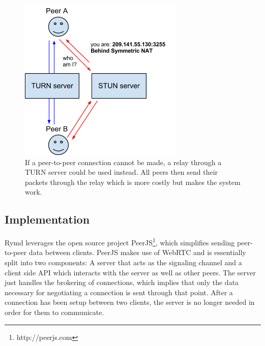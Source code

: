 \begin{figure}[htp]
\centering
\includegraphics[width=\textwidth,height=0.2\paperheight,keepaspectratio
]{figures/webrtc-turn}
\caption{If a peer-to-peer connection cannot be made, a relay through a TURN server could be used instead. All peers then send their packets through the relay which is more costly but makes the system work\cite{WebRTCArchitecture:2014:Online}.}
\label{fig:WebRTC - TURN}
\end{figure}

\subsection{Implementation}
\label{sec:p2p}

Rymd leverages the open source project PeerJS\footnote{http://peerjs.com}, which simplifies sending peer-to-peer data between clients. PeerJS makes use of WebRTC and is essentially split into two components: A server that acts as the signaling channel and a client side API which interacts with the server as well as other peers. The server just handles the brokering of connections, which implies that only the data necessary for negotiating a connection is sent through that point. After a connection has been setup between two clients, the server is no longer needed in order for them to communicate.

